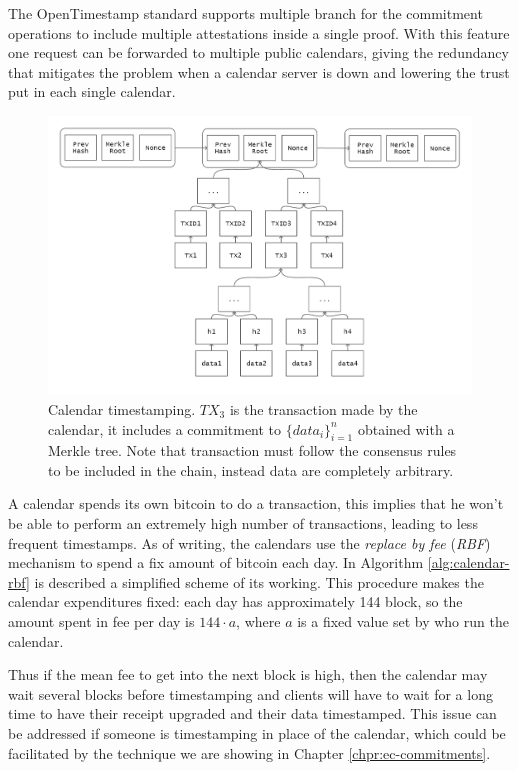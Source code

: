 The OpenTimestamp standard supports multiple branch for the commitment operations to include multiple attestations inside a single proof. With this feature one request can be forwarded to multiple public calendars, giving the redundancy that mitigates the problem when a calendar server is down and lowering the trust put in each single calendar.

\begin{figure}
	\begin{center}
		\includegraphics[width=\linewidth]{Images/bitcoin-chain-calendar.png}
		\caption[Calendar timestamping.]{Calendar timestamping. $TX_3$ is the transaction made by the calendar, it includes a commitment to $\{data_i\}_{i=1}^n$ obtained with a Merkle tree. Note that transaction must follow the consensus rules to be included in the chain, instead data are completely arbitrary.}
		\label{fig:chain-calendar}
	\end{center}
\end{figure}

A calendar spends its own bitcoin to do a transaction, this implies that he won't be able to perform an extremely high number of transactions, leading to less frequent timestamps. As of writing, the calendars use the \textit{replace by fee} (\textit{RBF}) mechanism to spend a fix amount of bitcoin each day. In Algorithm \ref{alg:calendar-rbf} is described a simplified scheme of its working.
This procedure makes the calendar expenditures fixed: each day has approximately 144 block, so the amount spent in fee per day is $144 \cdot a$, where $a$ is a fixed value set by who run the calendar.

Thus if the mean fee to get into the next block is high, then the calendar may wait several blocks before timestamping and clients will have to wait for a long time to have their receipt upgraded and their data timestamped. This issue can be addressed if someone is timestamping in place of the calendar, which could be facilitated by the technique we are showing in Chapter \ref{chpr:ec-commitments}. 

